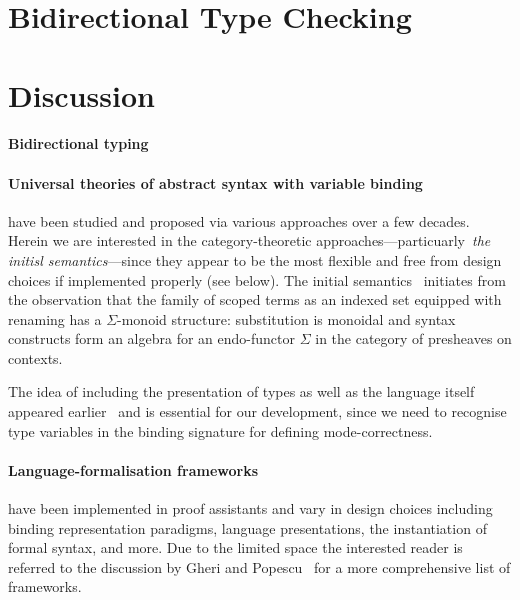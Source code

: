 \documentclass[envcountsect,runningheads,a4paper]{llncs}
\begin{document}
\section{Bidirectional Type Checking}
\section{Discussion}

\paragraph{Bidirectional typing}
\cite{Pierce2000a,Dunfield2021}

\paragraph{Universal theories of abstract syntax with variable binding} have been studied and proposed via various approaches over a few decades.
Herein we are interested in the category-theoretic approaches---particuarly \emph{the initisl semantics}---since they appear to be the most flexible and free from design choices if implemented properly (see below).
The initial semantics~\cite{Fiore1999} initiates from the observation that the family of scoped terms as an indexed set equipped with renaming has a $\Sigma$-monoid structure: substitution is monoidal and syntax constructs form an algebra for an endo-functor $\Sigma$ in the category of presheaves on contexts.


The idea of including the presentation of types as well as the language itself appeared earlier~\cite{Hamana2011a,Fiore2013a,Arkor2020} and is essential for our development, since we need to recognise type variables in the binding signature for defining mode-correctness.


\paragraph{Language-formalisation frameworks} have been implemented in proof assistants and vary in design choices including binding representation paradigms, language presentations, the instantiation of formal syntax, and more.
Due to the limited space the interested reader is referred to the discussion by Gheri and Popescu~\cite[Section 8]{Gheri2020} for a more comprehensive list of frameworks.
\end{document}
